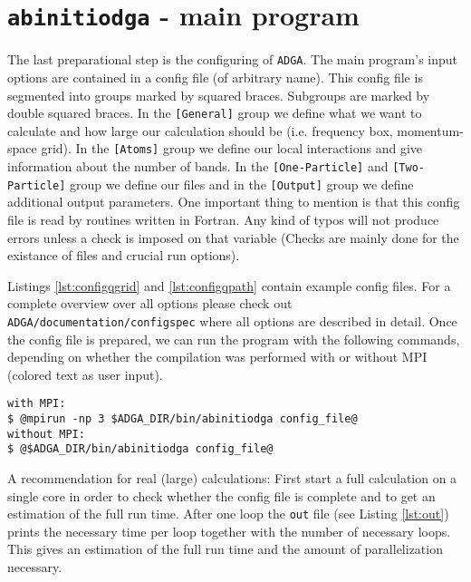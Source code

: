 \documentclass[a4paper,11pt]{article}
\numberwithin{equation}{section} %
\begin{document}
\newpage
\section{\protect\Verb+abinitiodga+ - main program}
The last preparational step is the configuring of \verb+ADGA+. The main program's input options are contained in a config file (of arbitrary name). This config file is segmented into groups marked by squared braces. Subgroups are marked by double squared braces. In the {\color{red} \verb|[General]|} group we define what we want to calculate and how large our calculation should be (i.e. frequency box, momentum-space grid). In the {\color{red} \verb|[Atoms]|} group we define our local interactions and give information about the number of bands. In the {\color{red} \verb|[One-Particle]|} and {\color{red} \verb|[Two-Particle]|} group we define our files and in the {\color{red} \verb|[Output]|} group we define additional output parameters. One important thing to mention is that this config file is read by routines written in Fortran. Any kind of typos will not produce errors unless a check is imposed on that variable (Checks are mainly done for the existance of files and crucial run options).


Listings \ref{lst:configqgrid} and \ref{lst:configqpath} contain example config files.
For a complete overview over all options please check out \\
{\color{blue}\verb|ADGA/documentation/configspec|} where all options are described in detail. Once the config file is prepared, we can run the program with the following commands, depending on whether the compilation was performed with or without MPI (colored text as user input).

\begin{lstlisting}[caption=abinitiodga run commands, frame=single, basicstyle=\small, style=base]
with MPI:
$ @mpirun -np 3 $ADGA_DIR/bin/abinitiodga config_file@
without MPI:
$ @$ADGA_DIR/bin/abinitiodga config_file@
\end{lstlisting}

A recommendation for real (large) calculations: First start a full calculation on a single core
in order to check whether the config file is complete and to get an estimation of the full run time.
After one loop the \verb+out+ file (see Listing \ref{lst:out}) prints the necessary time per loop together with the number of necessary loops. This gives an estimation of the full run time and the amount of parallelization necessary.
\end{document}
